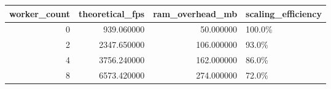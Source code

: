 \begin{tabular}{rrrl}
\toprule
worker\_count & theoretical\_fps & ram\_overhead\_mb & scaling\_efficiency \\
\midrule
0 & 939.060000 & 50.000000 & 100.0\% \\
2 & 2347.650000 & 106.000000 & 93.0\% \\
4 & 3756.240000 & 162.000000 & 86.0\% \\
8 & 6573.420000 & 274.000000 & 72.0\% \\
\bottomrule
\end{tabular}

